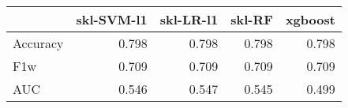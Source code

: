 \begin{tabular}{lrrrr}
\toprule
{} &  skl-SVM-l1 &  skl-LR-l1 &  skl-RF &  xgboost \\
\midrule
Accuracy &       0.798 &      0.798 &   0.798 &    0.798 \\
F1w      &       0.709 &      0.709 &   0.709 &    0.709 \\
AUC      &       0.546 &      0.547 &   0.545 &    0.499 \\
\bottomrule
\end{tabular}
